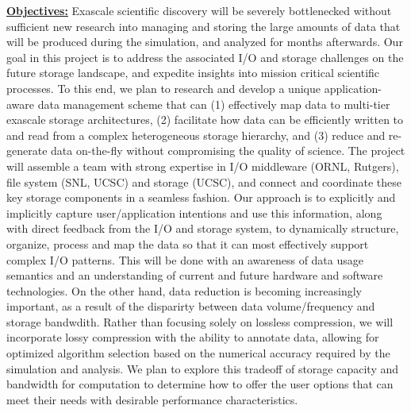 \documentclass[11pt,letterpaper]{article}
\begin{document}
\underline{\textbf{Objectives:}} Exascale scientific discovery will
be severely bottlenecked without sufficient new 
 research into managing and storing the large amounts of 
data that will be produced during the simulation, and analyzed for months afterwards.
Our goal in this project is to address the associated I/O and storage challenges on the 
future storage landscape, and expedite insights into mission critical
scientific processes. To this end, we plan
 to research and develop a unique application-aware data management scheme that
can (1) effectively map data to multi-tier exascale storage architectures, 
(2) facilitate how data can be efficiently written to and 
 read from a complex heterogeneous storage hierarchy, and (3) reduce and re-generate
data on-the-fly without compromising the quality of science. The project
will assemble a team with strong expertise in I/O middleware (ORNL, Rutgers), file system (SNL, UCSC)
and storage (UCSC), and connect and coordinate
these key storage components in a seamless fashion. 
%
%
Our approach is to explicitly and implicitly capture user/application intentions 
and use this information, along with direct feedback from the I/O and storage
system, to dynamically structure, organize, process and map the data so that 
it can most effectively support complex I/O patterns. This will be done
with an awareness of data usage semantics and an understanding 
of current and future hardware and software technologies. 
On the other hand, data reduction is becoming increasingly important, as a result of 
the disparirty between data volume/frequency and storage bandwdith. 
Rather than focusing solely on lossless 
compression, we will incorporate lossy compression with the ability to annotate 
data, allowing for optimized algorithm selection based on the numerical accuracy
required by the simulation and analysis. We plan to explore this tradeoff of storage 
capacity and bandwidth for computation to determine how to offer the user 
options that can meet their needs with desirable performance characteristics.
\end{document}
